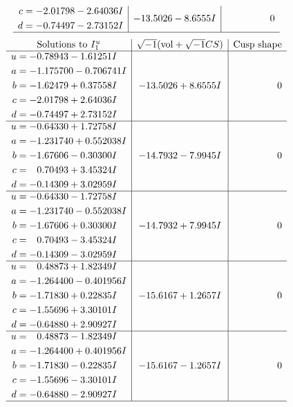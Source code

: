 \documentclass[1p]{elsarticle_modified}
\theoremstyle{definition}
\newcommand{\I}{\sqrt{-1}}
\begin{document}
$$\begin{array}{c|c|c}
\begin{aligned}
c &= -2.01798 - 2.64036 I \\
d &= -0.74497 - 2.73152 I\end{aligned}
 & -13.5026 - 8.6555 I & \phantom{-0.000000 } 0\\
 \hline 
 \end{array}$$\newpage$$\begin{array}{c|c|c}  
\text{Solutions to }I^u_{1}& \I (\text{vol} + \sqrt{-1}CS) & \text{Cusp shape}\\
 \hline 
\begin{aligned}
u &= -0.78943 - 1.61251 I \\
a &= -1.175700 - 0.706741 I \\
b &= -1.62479 + 0.37558 I \\
c &= -2.01798 + 2.64036 I \\
d &= -0.74497 + 2.73152 I\end{aligned}
 & -13.5026 + 8.6555 I & \phantom{-0.000000 } 0 \\ \hline\begin{aligned}
u &= -0.64330 + 1.72758 I \\
a &= -1.231740 + 0.552038 I \\
b &= -1.67606 - 0.30300 I \\
c &= \phantom{-}0.70493 + 3.45324 I \\
d &= -0.14309 + 3.02959 I\end{aligned}
 & -14.7932 - 7.9945 I & \phantom{-0.000000 } 0 \\ \hline\begin{aligned}
u &= -0.64330 - 1.72758 I \\
a &= -1.231740 - 0.552038 I \\
b &= -1.67606 + 0.30300 I \\
c &= \phantom{-}0.70493 - 3.45324 I \\
d &= -0.14309 - 3.02959 I\end{aligned}
 & -14.7932 + 7.9945 I & \phantom{-0.000000 } 0 \\ \hline\begin{aligned}
u &= \phantom{-}0.48873 + 1.82349 I \\
a &= -1.264400 - 0.401956 I \\
b &= -1.71830 + 0.22835 I \\
c &= -1.55696 + 3.30101 I \\
d &= -0.64880 + 2.90927 I\end{aligned}
 & -15.6167 + 1.2657 I & \phantom{-0.000000 } 0 \\ \hline\begin{aligned}
u &= \phantom{-}0.48873 - 1.82349 I \\
a &= -1.264400 + 0.401956 I \\
b &= -1.71830 - 0.22835 I \\
c &= -1.55696 - 3.30101 I \\
d &= -0.64880 - 2.90927 I\end{aligned}
 & -15.6167 - 1.2657 I & \phantom{-0.000000 } 0\\
 \hline 
 \end{array}$$\newpage\newpage\renewcommand{\arraystretch}{1}
\end{document}
